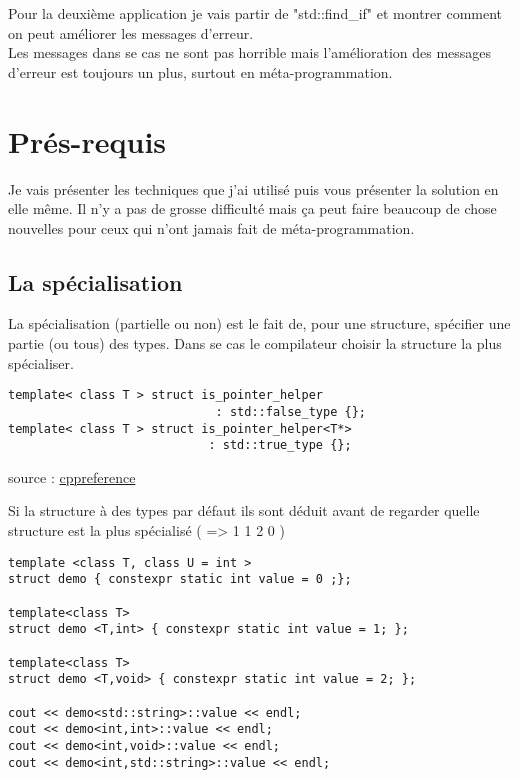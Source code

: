 \documentclass{beamer}
\begin{document}
\begin{frame}
	Pour la deuxième application je vais partir de "std::find\_if" et montrer comment on peut améliorer les messages d'erreur. \\
	Les messages dans se cas ne sont pas horrible mais l’amélioration des messages d'erreur est toujours un plus, surtout en méta-programmation.
\end{frame}

\section{Prés-requis}
\begin{frame}
	Je vais présenter les techniques que j'ai utilisé puis vous présenter la solution en elle même. Il n'y a pas de grosse difficulté mais ça peut faire beaucoup de chose nouvelles pour ceux qui n'ont jamais fait de méta-programmation. 
\end{frame}

\subsection{La spécialisation}

\begin{frame}[containsverbatim]
	La spécialisation (partielle ou non) est le fait de, pour une structure, spécifier une partie (ou tous) des types. Dans se cas le compilateur choisir la structure la plus spécialiser.\\
	
	\begin{verbatim}
template< class T > struct is_pointer_helper    
							 : std::false_type {};
template< class T > struct is_pointer_helper<T*> 
							: std::true_type {};
	\end{verbatim}
	source : \href{http://en.cppreference.com/w/cpp/types/is_pointer}{cppreference}
\end{frame}

\begin{frame}[containsverbatim]
	Si la structure à des types par défaut ils sont déduit avant de regarder quelle structure est la plus spécialisé ( => 1 1 2 0 )
	\begin{verbatim}
template <class T, class U = int >
struct demo { constexpr static int value = 0 ;};

template<class T>
struct demo <T,int> { constexpr static int value = 1; };

template<class T>
struct demo <T,void> { constexpr static int value = 2; };

cout << demo<std::string>::value << endl;
cout << demo<int,int>::value << endl;
cout << demo<int,void>::value << endl;
cout << demo<int,std::string>::value << endl;
	\end{verbatim}
	
\end{frame}
\end{document}
